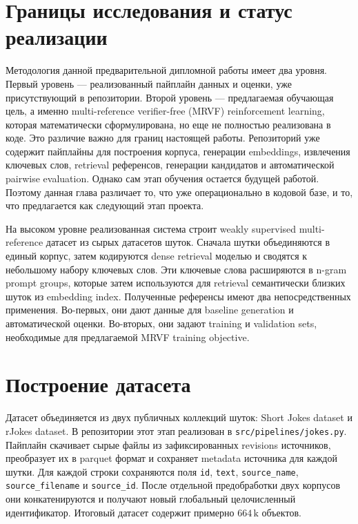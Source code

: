 \section{Границы исследования и статус реализации}

Методология данной предварительной дипломной работы имеет два уровня. Первый уровень --- реализованный пайплайн данных и оценки, уже присутствующий в репозитории. Второй уровень --- предлагаемая обучающая цель, а именно multi-reference verifier-free (MRVF) reinforcement learning, которая математически сформулирована, но еще не полностью реализована в коде. Это различие важно для границ настоящей работы. Репозиторий уже содержит пайплайны для построения корпуса, генерации embeddings, извлечения ключевых слов, retrieval референсов, генерации кандидатов и автоматической pairwise evaluation. Однако сам этап обучения остается будущей работой. Поэтому данная глава различает то, что уже операционально в кодовой базе, и то, что предлагается как следующий этап проекта.

На высоком уровне реализованная система строит weakly supervised multi-reference датасет из сырых датасетов шуток. Сначала шутки объединяются в единый корпус, затем кодируются dense retrieval моделью и сводятся к небольшому набору ключевых слов. Эти ключевые слова расширяются в n-gram prompt groups, которые затем используются для retrieval семантически близких шуток из embedding index. Полученные референсы имеют два непосредственных применения. Во-первых, они дают данные для baseline generation и автоматической оценки. Во-вторых, они задают training и validation sets, необходимые для предлагаемой MRVF training objective.

\section{Построение датасета}

Датасет объединяется из двух публичных коллекций шуток: Short Jokes dataset и rJokes dataset. В репозитории этот этап реализован в \texttt{src/pipelines/jokes.py}. Пайплайн скачивает сырые файлы из зафиксированных revisions источников, преобразует их в parquet формат и сохраняет metadata источника для каждой шутки. Для каждой строки сохраняются поля \texttt{id}, \texttt{text}, \texttt{source\_name}, \texttt{source\_filename} и \texttt{source\_id}. После отдельной предобработки двух корпусов они конкатенируются и получают новый глобальный целочисленный идентификатор. Итоговый датасет содержит примерно \(664\,\text{k}\) объектов.

